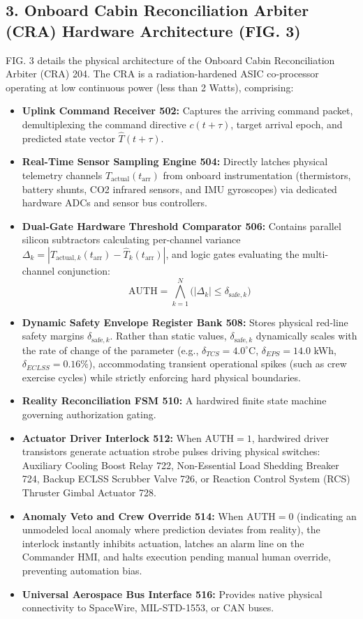 \documentclass[12pt,a4paper]{article}
\begin{document}
\subsection*{3. Onboard Cabin Reconciliation Arbiter (CRA) Hardware Architecture (FIG. 3)}
FIG. 3 details the physical architecture of the Onboard Cabin Reconciliation Arbiter (CRA) 204. The CRA is a radiation-hardened ASIC co-processor operating at low continuous power (less than 2 Watts), comprising:
\begin{itemize}
    \item \textbf{Uplink Command Receiver 502:} Captures the arriving command packet, demultiplexing the command directive $c(t+\tau)$, target arrival epoch, and predicted state vector $\hat{T}(t+\tau)$.
    \item \textbf{Real-Time Sensor Sampling Engine 504:} Directly latches physical telemetry channels $T_{\text{actual}}(t_{\text{arr}})$ from onboard instrumentation (thermistors, battery shunts, CO2 infrared sensors, and IMU gyroscopes) via dedicated hardware ADCs and sensor bus controllers.
    \item \textbf{Dual-Gate Hardware Threshold Comparator 506:} Contains parallel silicon subtractors calculating per-channel variance $\Delta_k = |T_{\text{actual},k}(t_{\text{arr}}) - \hat{T}_k(t_{\text{arr}})|$, and logic gates evaluating the multi-channel conjunction:
    \begin{equation}
        \text{AUTH} = \bigwedge_{k=1}^N \bigl(|\Delta_k| \le \delta_{\text{safe},k}\bigr)
    \end{equation}
    \item \textbf{Dynamic Safety Envelope Register Bank 508:} Stores physical red-line safety margins $\delta_{\text{safe},k}$. Rather than static values, $\delta_{\text{safe},k}$ dynamically scales with the rate of change of the parameter (e.g., $\delta_{TCS} = 4.0^\circ$C, $\delta_{EPS} = 14.0$ kWh, $\delta_{ECLSS} = 0.16\%$), accommodating transient operational spikes (such as crew exercise cycles) while strictly enforcing hard physical boundaries.
    \item \textbf{Reality Reconciliation FSM 510:} A hardwired finite state machine governing authorization gating.
    \item \textbf{Actuator Driver Interlock 512:} When $\text{AUTH} = 1$, hardwired driver transistors generate actuation strobe pulses driving physical switches: Auxiliary Cooling Boost Relay 722, Non-Essential Load Shedding Breaker 724, Backup ECLSS Scrubber Valve 726, or Reaction Control System (RCS) Thruster Gimbal Actuator 728.
    \item \textbf{Anomaly Veto and Crew Override 514:} When $\text{AUTH} = 0$ (indicating an unmodeled local anomaly where prediction deviates from reality), the interlock instantly inhibits actuation, latches an alarm line on the Commander HMI, and halts execution pending manual human override, preventing automation bias.
    \item \textbf{Universal Aerospace Bus Interface 516:} Provides native physical connectivity to SpaceWire, MIL-STD-1553, or CAN buses.
\end{itemize}
\end{document}
